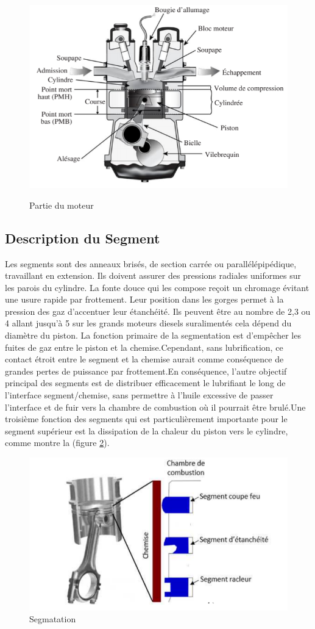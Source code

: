 \begin{figure}[h]
	\centering
	\includegraphics[width=0.5\linewidth]{"Img/partie du moteur"}
	\caption[Partie du moteur]{Partie du moteur}
	\label{fig:partie-du-moteur} \cite{approche}
\end{figure}

\subsection{Description du Segment}
Les segments sont des anneaux brisés, de section carrée ou parallélépipédique, travaillant en extension. Ils doivent assurer des pressions radiales uniformes sur les parois du cylindre. La fonte douce qui les compose reçoit un chromage évitant une usure rapide par frottement. Leur position dans les gorges permet à la pression des gaz d'accentuer leur étanchéité.\cite{tecauto} Ils peuvent être au nombre de 2,3 ou 4 allant jusqu'à 5 sur les grands moteurs diesels suralimentés cela dépend du diamètre du piston. La fonction primaire de la segmentation est d'empêcher les fuites de gaz entre le piston et la chemise.Cependant, sans lubrification, ce contact étroit entre le segment et la chemise aurait comme conséquence de grandes pertes de puissance par frottement.En conséquence, l'autre objectif principal des segments est de distribuer efficacement le lubrifiant le long de l'interface segment/chemise, sans permettre à l'huile excessive de passer l'interface et de fuir vers la chambre de combustion où il pourrait être brulé.Une troisième fonction des segments qui est particulièrement importante pour le segment supérieur est la dissipation de la chaleur du piston vers le cylindre, comme montre la (figure \ref{fig:partie-du-segment}).\\

\begin{figure}
	\centering
	\includegraphics[width=0.5\linewidth]{"Img/partie du segment"}
	\caption[Segmentation]{Segmatation}
	\label{fig:partie-du-segment}
\end{figure}


